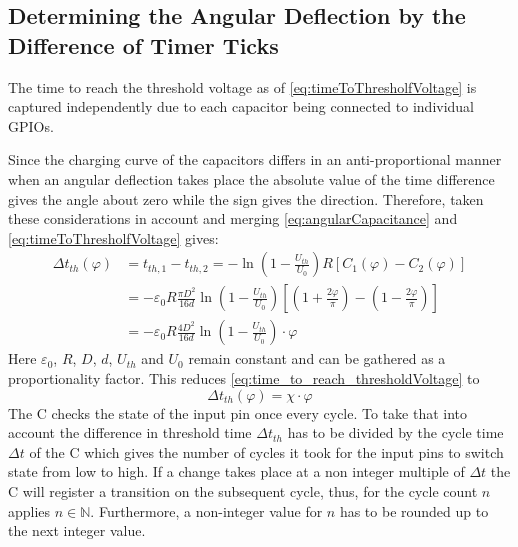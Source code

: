     \subsection{Determining the Angular Deflection by the Difference of Timer Ticks}\label{sec:preparation_task_7}
        The time to reach the threshold voltage as of \cref{eq:timeToThresholfVoltage} is captured independently due to
        each capacitor being connected to individual GPIOs.\par
        Since the charging curve of the capacitors differs in an anti-proportional manner when an angular deflection takes
        place the absolute value of the time difference gives the angle about zero while the sign gives the direction.
        Therefore, taken these considerations in account and merging \cref{eq:angularCapacitance} and \cref{eq:timeToThresholfVoltage}
        gives:
        \begin{align}
            \Delta t_{th}(\varphi)   &= t_{th,1} - t_{th,2} = -\ln\left( 1- \frac{U_{th}}{U_0} \right)R\left[ C_1(\varphi) - C_2(\varphi) \right] \nonumber \\
                            &= -\varepsilon_0 R \frac{\pi D^2}{16d} \ln\left( 1 - \frac{U_{th}}{U_0} \right) \left[ \left( 1 + \frac{2\varphi}{\pi} \right) - \left( 1 - \frac{2\varphi}{\pi} \right) \right] \nonumber \\
                            &= -\varepsilon_0 R \frac{4D^2}{16d} \ln\left( 1 - \frac{U_{th}}{U_0} \right) \cdot \varphi
            \label{eq:time_to_reach_thresholdVoltage}
        \end{align}
        Here \( \varepsilon_0 \), \( R \), \( D \), \( d \), \( U_{th} \) and \( U_0 \) remain constant and can be gathered as a proportionality
        factor. This reduces \cref{eq:time_to_reach_thresholdVoltage} to
        \begin{equation}
            \Delta t_{th}(\varphi) = \chi \cdot \varphi
            \label{eq:simplified_time_to_reach_thresholdVoltage}
        \end{equation}
        The \micro C checks the state of the input pin once every cycle. To take that into account the difference in threshold time
        \( \Delta t_{th} \) has to be divided by the cycle time \( \Delta t \) of the \micro C which gives the number of cycles it took for the
        input pins to switch state from low to high. If a change takes place at a non integer multiple of \( \Delta t \)
        the \micro C will register a transition on the subsequent cycle, thus, for the cycle count \( n \) applies \( n \in \mathbb{N} \).
        Furthermore, a non-integer value for \( n \) has to be rounded up to the next integer value.

